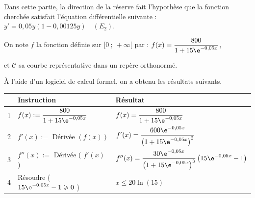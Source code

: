 	Dans cette partie, la direction de la réserve fait l'hypothèse que la fonction cherchée satisfait l'équation différentielle suivante :
$y'=0,05 y \left (1-0,00125 y\right ) \quad (E_2)$.

On note $f$ la fonction définie sur $[0 ~;~ +\infty[$ par :
$f(x)=\dfrac{800}{1+15 \e^{-0,05 x}}$,

	et $\mathcal{C}$ sa courbe représentative dans un repère orthonormé.

	\medskip

	À l'aide d'un logiciel de calcul formel, on a obtenu les résultats suivants.



	\begin{center}
\renewcommand{\arraystretch}{1.5}
\begin{tabularx}{\linewidth}{|l|l|>{\centering \arraybackslash}X|} 
\hline
  & Instruction & Résultat \\	
\hline
1 & $f(x):=\dfrac{800}{1+15 \e^{-0,05 x}}$	& $f(x)=\dfrac{800}{1+15 \e^{-0,05 x}}$  \rule[-13pt]{0pt}{30pt}\\	
\hline
2 & $f'(x):=$ Dérivée $(f(x))$ & $f'(x)=\dfrac{600 \e^{-0,05 x}}{\left(1+15 \e^{-0,05 x}\right)^{2}}$ \rule[-15pt]{0pt}{35pt} \\ 
\hline
3 & $f''(x):=$ Dérivée ( $f'(x)$ ) & $f''(x)=\dfrac{30 \e^{-0,05 x}}{\left(1+15 \e^{-0,05 x}\right)^{3}}\left(15 \e^{-0,05 x}-1\right)$ \rule[-15pt]{0pt}{35pt} \\ 
\hline
4 & Résoudre ( $15 \e^{-0,05 x}-1 \geqslant 0$ )  & $x \leqslant 20 \ln (15)$  \\		
\hline
\end{tabularx}
\renewcommand{\arraystretch}{1}
	\end{center}

